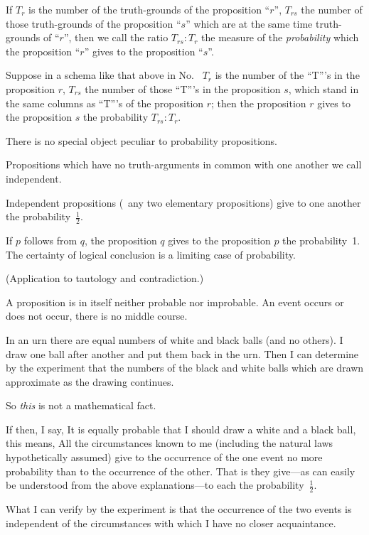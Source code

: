 {If $T_{r}$ is the number of the truth-grounds of the
proposition ``$r$'', $T_{rs}$ the number of those truth-grounds
of the proposition ``$s$'' which are at the
same time truth-grounds of ``$r$'', then we call the
ratio $T_{rs} : T_{r}$ the measure of the \emph{probability} which
the proposition ``$r$'' gives to the proposition ``$s$''.}


{Suppose in a schema like that above in No.~
$T_{r}$ is the number of the ``T'''s in the proposition
$r$, $T_{rs}$ the number of those ``T'''s in
the proposition $s$, which stand in the same columns
as ``T'''s of the proposition $r$; then the proposition
$r$ gives to the proposition $s$ the probability
$T_{rs} : T_{r}$.}


{There is no special object peculiar to probability
propositions.}


{Propositions which have no truth-arguments
in common with one another we call independent.
\enlargethispage{-3pt} %

Independent propositions (\exempliGratia\ any two elementary
propositions) give to one another the probability~$\frac{1}{2}$.

If $p$ follows from $q$, the proposition $q$ gives
to the proposition $p$ the probability~1. The
certainty of logical conclusion is a limiting case
of probability.

(Application to tautology and contradiction.)}


{A proposition is in itself neither probable nor
improbable. An event occurs or does not occur,
there is no middle course.}


{In an urn there are equal numbers of white
and black balls (and no others). I draw one
ball after another and put them back in the
urn. Then I can determine by the experiment
that the numbers of the black and white balls
which are drawn approximate as the drawing
continues.

So \emph{this} is not a mathematical fact.

If then, I say, It is equally probable that
I should draw a white and a black ball, this
means, All the circumstances known to me (including
the natural laws hypothetically assumed)
give to the occurrence of the one event no more
probability than to the occurrence of the other.
That is they give---as can easily be understood
from the above explanations---to each the
probability~$\frac{1}{2}$.

What I can verify by the experiment is that
the occurrence of the two events is independent
of the circumstances with which I have no closer
acquaintance.}


